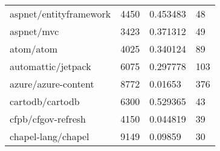 \begin{table}[]
\begin{tabular}{llll}
aspnet/entityframework                      & 4450                               & 0.453483                                                                                                          & 48                                                                                                            \\
aspnet/mvc                                  & 3423                               & 0.371312                                                                                                          & 49                                                                                                            \\
atom/atom                                   & 4025                               & 0.340124                                                                                                          & 89                                                                                                            \\
automattic/jetpack                          & 6075                               & 0.297778                                                                                                          & 103                                                                                                           \\
azure/azure-content                         & 8772                               & 0.01653                                                                                                           & 376                                                                                                           \\
cartodb/cartodb                             & 6300                               & 0.529365                                                                                                          & 43                                                                                                            \\
cfpb/cfgov-refresh                          & 4150                               & 0.044819                                                                                                          & 39                                                                                                            \\
chapel-lang/chapel                          & 9149                               & 0.09859                                                                                                           & 30                                                                                                            \\

\end{tabular}
\end{table}
